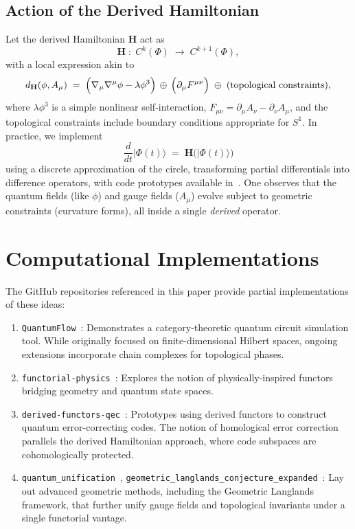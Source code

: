\documentclass[11pt]{article}
\begin{document}
\subsection{Action of the Derived Hamiltonian}

Let the derived Hamiltonian $\mathbf{H}$ act as
\[
\mathbf{H} \;:\; 
C^k(\Phi) \;\longrightarrow\; C^{k+1}(\Phi),
\]
with a local expression akin to
\begin{equation}
\label{eq:toy-derived-h}
d_{\mathbf{H}}(\phi, A_\mu) 
\;=\; 
\Bigl(\nabla_\mu \nabla^\mu \phi - \lambda \phi^3\Bigr)\,\oplus\,
\Bigl(\partial_\mu F^{\mu\nu}\Bigr)
\;\oplus\; 
(\text{topological constraints}),
\end{equation}
where $\lambda \phi^3$ is a simple nonlinear self-interaction, $F_{\mu\nu} = \partial_\mu A_\nu - \partial_\nu A_\mu$, and the topological constraints include boundary conditions appropriate for $S^1$. In practice, we implement
\[
\frac{d}{dt}|\Phi(t)\rangle \;=\; \mathbf{H}\bigl(|\Phi(t)\rangle\bigr)
\]
using a discrete approximation of the circle, transforming partial differentials into difference operators, with code prototypes available in~\cite{quantum-unification, derived-functors-qec}. One observes that the quantum fields (like $\phi$) and gauge fields ($A_\mu$) evolve subject to geometric constraints (curvature forms), all inside a single \emph{derived} operator.

\section{Computational Implementations}
\label{sec:computational}

The GitHub repositories referenced in this paper provide partial implementations of these ideas:

\begin{enumerate}
    \item \texttt{QuantumFlow}~\cite{QuantumFlow}: Demonstrates a category-theoretic quantum circuit simulation tool. While originally focused on finite-dimensional Hilbert spaces, ongoing extensions incorporate chain complexes for topological phases.
    \item \texttt{functorial-physics}~\cite{functorial-physics}: Explores the notion of physically-inspired functors bridging geometry and quantum state spaces.
    \item \texttt{derived-functors-qec}~\cite{derived-functors-qec}: Prototypes using derived functors to construct quantum error-correcting codes. The notion of homological error correction parallels the derived Hamiltonian approach, where code subspaces are cohomologically protected.
    \item \texttt{quantum\_unification}~\cite{quantum-unification}, \texttt{geometric\_langlands\_conjecture\_expanded}~\cite{geom-lang}: Lay out advanced geometric methods, including the Geometric Langlands framework, that further unify gauge fields and topological invariants under a single functorial vantage.
\end{enumerate}
\end{document}
